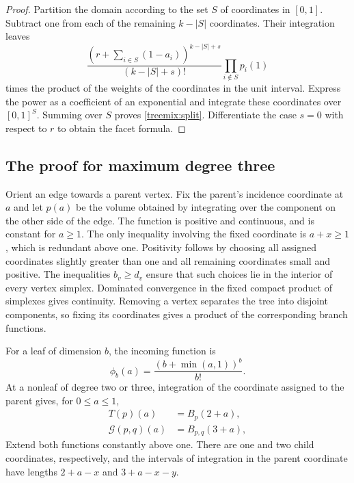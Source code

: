 \begin{proof}
Partition the domain according to the set $S$ of coordinates in $[0,1]$.
Subtract one from each of the remaining $k-|S|$ coordinates. Their
integration leaves
\[
 \frac{(r+\sum_{i\in S}(1-a_i))^{k-|S|+s}}{(k-|S|+s)!}
 \prod_{i\notin S}p_i(1)
\]
times the product of the weights of the coordinates in the unit
interval. Express the power as a coefficient of an exponential and
integrate these coordinates over $[0,1]^S$. Summing over $S$ proves
\eqref{treemix:split}. Differentiate the case $s=0$ with respect to $r$
to obtain the facet formula.
\end{proof}

\subsection{The proof for maximum degree three}

Orient an edge towards a parent vertex. Fix the parent's incidence
coordinate at $a$ and let $p(a)$ be the volume obtained by integrating
over the component on the other side of the edge. The function is
positive and continuous, and is constant for $a\ge1$. The only
inequality involving the fixed coordinate is $a+x\ge1$, which is
redundant above one. Positivity follows by choosing
all assigned coordinates slightly greater than one and all remaining
coordinates small and positive. The inequalities $b_v\ge d_v$ ensure that such choices lie in the
interior of every vertex simplex. Dominated convergence in the fixed
compact product of simplexes gives continuity. Removing a vertex
separates the tree into disjoint components, so fixing its coordinates
gives a product of the corresponding branch functions.

For a leaf of dimension $b$, the incoming function is
\[
 \phi_b(a)=\frac{(b+\min(a,1))^b}{b!}.
\]
At a nonleaf of degree two or three, integration of the coordinate
assigned to the parent gives, for $0\le a\le1$,
\begin{align}
 T(p)(a)&=B_p(2+a),\label{treemix:T}\\
 \mathcal G(p,q)(a)&=B_{p,q}(3+a),\label{treemix:G}
\end{align}
Extend both functions constantly above one. There are one and two child
coordinates, respectively, and the intervals of integration in the
parent coordinate have lengths $2+a-x$ and $3+a-x-y$.

